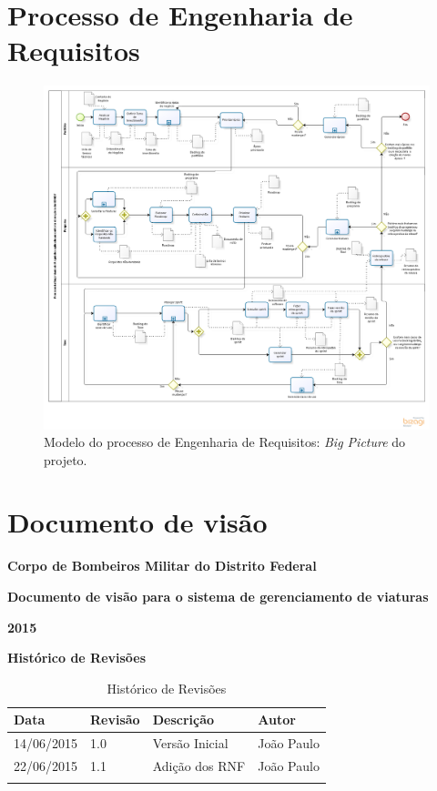 \begin{apendicesenv}
  
  \chapter{Processo de Engenharia de Requisitos}
  
    \begin{figure}[!htbp]
      \centering
      \includegraphics[scale=0.46, angle = 90]{figuras/project_big_picture}
      \caption[Modelo do processo de Engenharia de Requisitos]
	  {Modelo do processo de Engenharia de Requisitos: \textit{Big Picture} do projeto.}
      \label{project_big_picture}
    \end{figure}
  
  \chapter{Documento de visão}
	{\centering
	\textbf{Corpo de Bombeiros Militar do Distrito Federal}

	\textbf{Documento de visão para o sistema de gerenciamento de viaturas}

	\textbf{2015}

	}
	\textbf{Histórico de Revisões}
	\begin{table}[h]
	\centering
	\label{my-label}
	\begin{tabular}{|l|l|l|l|}
	\hline
	Data & Revisão & Descrição & Autor \\ \hline
	14/06/2015 & 1.0 & Versão Inicial & João Paulo \\ \hline
	22/06/2015 & 1.1 & Adição dos RNF & João Paulo \\ \hline
	     &         &           &       \\ \hline
	\end{tabular}
	\caption{Histórico de Revisões}
	\end{table}
  

\end{apendicesenv}
